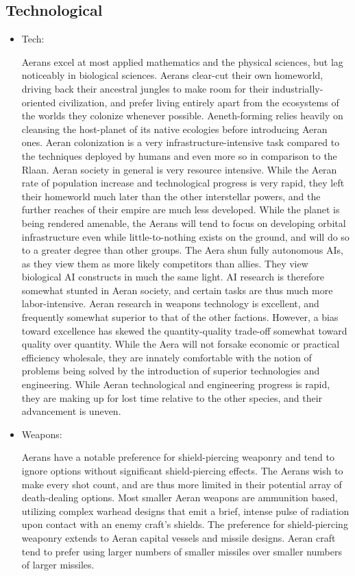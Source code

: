 \subsection{Technological}
\begin{itemize}
\item Tech: 

Aerans excel at most applied mathematics and the physical sciences,
but lag noticeably in biological sciences. Aerans clear-cut their own
homeworld, driving back their ancestral jungles to make room for their
industrially-oriented civilization, and prefer living entirely apart
from the ecosystems of the worlds they colonize whenever
possible. Aeneth-forming relies heavily on cleansing the host-planet
of its native ecologies before introducing Aeran ones. Aeran
colonization is a very infrastructure-intensive task compared to the
techniques deployed by humans and even more so in comparison to the
Rlaan. Aeran society in general is very resource intensive. While the
Aeran rate of population increase and technological progress is very
rapid, they left their homeworld much later than the other
interstellar powers, and the further reaches of their empire are much
less developed. While the planet is being rendered amenable, the
Aerans will tend to focus on developing orbital infrastructure even
while little-to-nothing exists on the ground, and will do so to a
greater degree than other groups. The Aera shun fully autonomous AIs,
as they view them as more likely competitors than allies. They view
biological AI constructs in much the same light. AI research is
therefore somewhat stunted in Aeran society, and certain tasks are
thus much more labor-intensive. Aeran research in weapons technology
is excellent, and frequently somewhat superior to that of the other
factions. However, a bias toward excellence has skewed the
quantity-quality trade-off somewhat toward quality over
quantity. While the Aera will not forsake economic or practical
efficiency wholesale, they are innately comfortable with the notion of
problems being solved by the introduction of superior technologies and
engineering. While Aeran technological and engineering progress is
rapid, they are making up for lost time relative to the other species,
and their advancement is uneven.

\item Weapons:

Aerans have a notable preference for shield-piercing weaponry and tend
to ignore options without significant shield-piercing effects. The
Aerans wish to make every shot count, and are thus more limited in
their potential array of death-dealing options. Most smaller Aeran
weapons are ammunition based, utilizing complex warhead designs that
emit a brief, intense pulse of radiation upon contact with an enemy
craft's shields. The preference for shield-piercing weaponry extends
to Aeran capital vessels and missile designs. Aeran craft tend to
prefer using larger numbers of smaller missiles over smaller numbers
of larger missiles.


\end{itemize}
